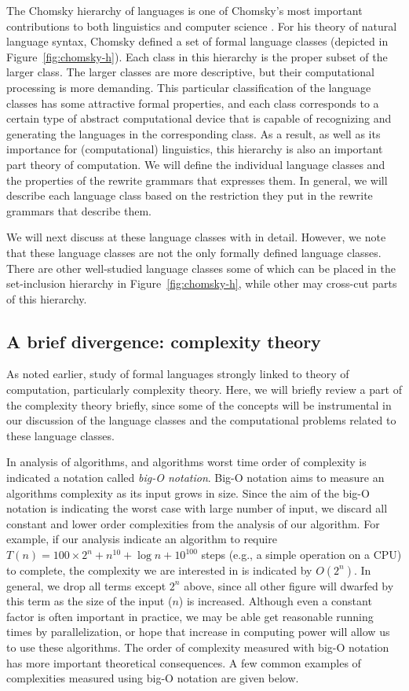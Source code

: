 The Chomsky hierarchy of languages
is one of Chomsky's most important contributions
to both linguistics and computer science \parencite{chomsky1959b}.
For his theory of natural language syntax,
Chomsky defined a set of formal language classes
(depicted in Figure~\ref{fig:chomsky-h}).
Each class in this hierarchy is the proper subset of the larger class.
The larger classes are more descriptive,
but their computational processing is more demanding.
This particular classification of the language classes
has some attractive formal properties,
and each class corresponds to
a certain type of abstract computational device
that is capable of recognizing
and generating the languages in the corresponding class.
As a result, as well as its importance for (computational) linguistics,
this hierarchy is also an important part theory of computation.
We will define the individual language classes and the
properties of the rewrite grammars that expresses them.
In general, we will describe each language class
based on the restriction they put in the rewrite grammars that describe them.

We will next discuss at these language classes with in detail.
However, we note that these language classes are not 
the only formally defined language classes.
There are other well-studied language classes
some of which can be placed
in the set-inclusion hierarchy in Figure~\ref{fig:chomsky-h},
while other may cross-cut parts of this hierarchy.

\subsection{A brief divergence: complexity theory}

As noted earlier,
study of formal languages strongly linked to theory of computation,
particularly complexity theory.
Here, we will briefly review a part of the complexity theory briefly,
since some of the concepts will be instrumental in our discussion
of the language classes and the computational problems
related to these language classes.

In analysis of algorithms,
and algorithms worst time order of complexity 
is indicated a notation called \emph{big-O notation}.
Big-O notation aims to measure an algorithms complexity
as its input grows in size.
Since the aim of the big-O notation is indicating
the worst case with large number of input,
we discard all constant and lower order complexities from
the analysis of our algorithm.
For example, if our analysis indicate an algorithm to require
$T(n) = 100\times{}2^{n} + n^{10} + \log{n} + 10^{100}$ steps
(e.g., a simple operation on a CPU) to complete,
the complexity we are interested in is indicated by $O(2^{n})$.
In general, we drop all terms except $2^{n}$ above,
since all other figure will dwarfed by this term
as the size of the input ($n$) is increased.
Although even a constant factor is often important in practice,
we may be able get reasonable running times by parallelization,
or hope that increase in computing power will allow us
to use these algorithms.
The order of complexity measured with big-O notation has
more important theoretical consequences.
A few common examples of complexities measured using big-O notation
are given below.


